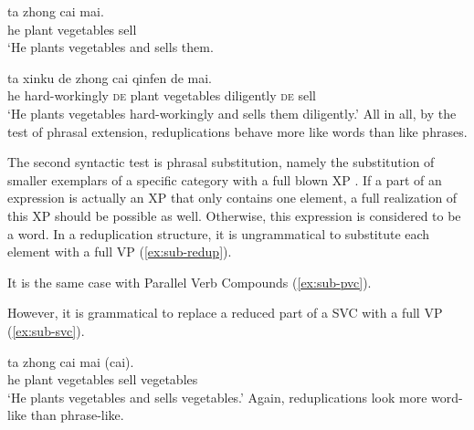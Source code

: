 \ea
  \ea\label{ex:ext-svc1}
  \gll ta zhong cai mai.\\
  he plant vegetables sell\\
  \glt `He plants vegetables and sells them.
  
  \ex\label{ex:ext-svc2}
  \gll ta xinku de zhong cai qinfen de mai.\\
  he hard-workingly \textsc{de} plant vegetables diligently \textsc{de} sell\\
  \glt `He plants vegetables hard-workingly and sells them diligently.'
  \z
\z
All in all, by the test of phrasal extension, reduplications behave more like words than like phrases.



The second syntactic test is phrasal substitution, namely the substitution of smaller exemplars of a specific category with a full blown XP \citetext{\citealp[152]{Duanmu1998}; \citealp[280]{Schaefer2009}}. 
If a part of an expression is actually an XP that only contains one element, a full realization of this XP should be possible as well.
Otherwise, this expression is considered to be a word.
In a reduplication structure, it is ungrammatical to substitute each element with a full {VP} (\ref{ex:sub-redup}).

\ea\label{ex:sub-redup}
    
  \z
\z

It is the same case with Parallel Verb Compounds (\ref{ex:sub-pvc}).

\label{ex:sub-pvc}
\z

However, it is grammatical to replace a reduced part of a {SVC} with a full VP (\ref{ex:sub-svc}).

\ea\label{ex:sub-svc}
\gll ta zhong cai mai (cai).\\
 he plant vegetables sell vegetables\\
\glt `He plants vegetables and sells vegetables.'
 \z
Again, reduplications look more word-like than phrase-like.


